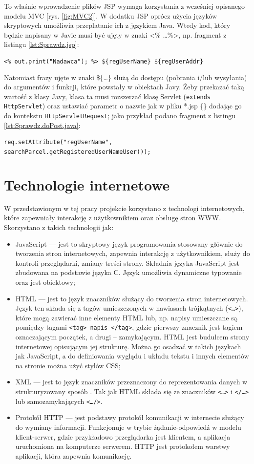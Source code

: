 \documentclass[eng,printmode,oneside]{mgr}
\begin{document}
To właśnie wprowadzenie plików JSP wymaga korzystania z wcześniej
opisanego modelu MVC [rys. \ref{fig:MVC2}]. W dodatku JSP oprócz użycia języków
skryptowych umożliwia przeplatanie ich z językiem Java. Wtedy kod, który będzie
napisany w Javie musi być ujęty w znaki <\% \ldots \%>, np. fragment z listingu
\ref{lst:Sprawdz.jsp}:

\texttt{<\% out.print("Nadawca"); \%> \$\{regUserName\}
\$\{regUserAddr\}}

Natomiast frazy ujęte w znaki \$\{\ldots\} służą do dostępu (pobrania
i/lub wysyłania) do argumentów i funkcji, które powstały w obiektach Javy. Żeby
przekazać taką wartość z klasy Javy, klasa ta musi rozszerzać klasę Servlet
(\texttt{extends HttpServlet}) oraz ustawiać parametr o nazwie jak w pliku *.jsp
\{\} dodając go do kontekstu \texttt{HttpServletRequest}; jako przykład podano
fragment z listingu \ref{lst:Sprawdz.doPost.java}:

\texttt{req.setAttribute("regUserName",
						searchParcel.getRegisteredUserNameUser());}

\section{Technologie internetowe}

W przedstawionym w tej pracy projekcie korzystano z technologi internetowych,
które zapewniały interakcję z użytkownikiem oraz obsługę stron WWW. Skorzystano
z takich technologii jak:
\begin{itemize}
  \item JavaScript --- jest to skryptowy język programowania stosowany głównie do
  tworzenia stron internetowych, zapewnia interakcję z
  użytkownikiem\cite{javascript.wiki}, służy do kontroli przeglądarki, zmiany
  treści strony. Składnia języka JavaScript jest zbudowana na podstawie języka
  C. Język umożliwia dynamiczne typowanie oraz jest obiektowy;
  \item HTML --- jest to język znaczników służący do tworzenia stron
  internetowych. Język ten składa się z tagów umieszczonych w
  nawiasach trójkątnych (\texttt{<\ldots>}), które mogą zawierać inne
  elementy HTML lub, np.
  napisy umieszczane są pomiędzy tagami \texttt{<tag> napis </tag>}, gdzie
  pierwszy znacznik jest tagiem oznaczającym początek, a drugi -- zamykającym.
  HTML jest budulcem strony internetowej opisującym jej strukturę.
  Można go osadzać w takich językach jak JavaScript, a do definiowania wyglądu i
  układu tekstu i innych elementów na stronie można użyć stylów CSS;
  \item XML --- jest to język znaczników przeznaczony do reprezentowania danych w
  strukturyzowany sposób \cite{xml.wiki}. Tak jak HTML składa się ze znaczników
  \texttt{<\ldots>} i \texttt{</\ldots>} lub samozamykających
  \texttt{<\ldots/>}.
  \item Protokół HTTP --- jest podstawy protokół komunikacji w internecie służący
  do wymiany informacji. Funkcjonuje w trybie żądanie-odpowiedź w modelu
  klient-serwer, gdzie przykładowo przeglądarka jest klientem, a aplikacja
  uruchomiona na komputerze serwerem. HTTP jest protokołem warstwy aplikacji, która zapewnia komunikację.
\end{itemize}
\end{document}
